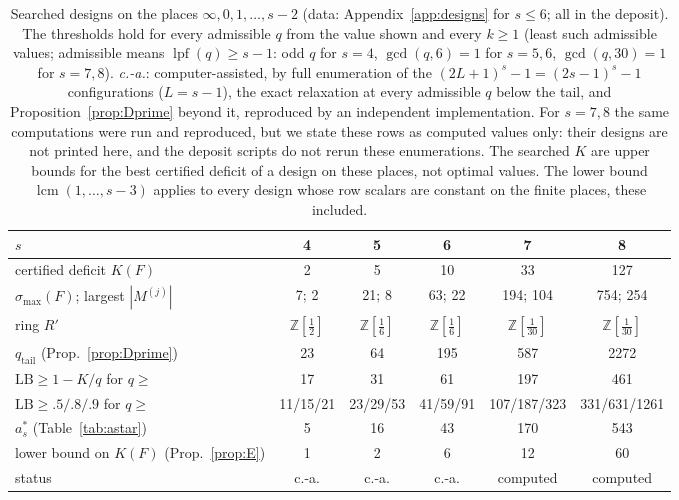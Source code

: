 \documentclass[11pt]{amsart}
\theoremstyle{definition}
\theoremstyle{plain}
\newcommand{\Z}{\mathbb{Z}}
\begin{document}
\begin{table}[tbp]
\centering\small\setlength{\tabcolsep}{4.5pt}
\begin{tabular}{@{}lccccc@{}}
\toprule
$s$ & 4 & 5 & 6 & 7 & 8\\
\midrule
certified deficit $K(F)$ & 2 & 5 & 10 & 33 & 127\\
$\sigma_{\max}(F)$; largest $|M^{(j)}|$ & 7; 2 & 21; 8 & 63; 22 & 194; 104 & 754; 254\\
ring $R'$ & $\Z[\frac12]$ & $\Z[\frac16]$ & $\Z[\frac16]$ & $\Z[\frac1{30}]$ & $\Z[\frac1{30}]$\\
$q_{\mathrm{tail}}$ (Prop.~\ref{prop:Dprime}) & 23 & 64 & 195 & 587 & 2272\\
$\mathrm{LB}\ge1-K/q$ for $q\ge$ & 17 & 31 & 61 & 197 & 461\\
$\mathrm{LB}\ge.5/.8/.9$ for $q\ge$ & 11/15/21 & 23/29/53 & 41/59/91 & 107/187/323 & 331/631/1261\\
\midrule
$a^*_s$ (Table~\ref{tab:astar}) & 5 & 16 & 43 & 170 & 543\\
lower bound on $K(F)$ (Prop.~\ref{prop:E}) & 1 & 2 & 6 & 12 & 60\\
status & c.-a. & c.-a. & c.-a. & computed & computed\\
\bottomrule
\end{tabular}
\medskip
\caption{Searched designs on the places $\infty,0,1,\dots,s-2$ (data: Appendix~\ref{app:designs} for $s\le6$; all in the deposit). The thresholds hold for every admissible $q$ from the value shown and every $k\ge1$ (least such admissible values; admissible means $\operatorname{lpf}(q)\ge s-1$: odd $q$ for $s=4$, $\gcd(q,6)=1$ for $s=5,6$, $\gcd(q,30)=1$ for $s=7,8$). \emph{c.-a.}: computer-assisted, by full enumeration of the $(2L+1)^s-1=(2s-1)^s-1$ configurations ($L=s-1$), the exact relaxation at every admissible $q$ below the tail, and Proposition~\ref{prop:Dprime} beyond it, reproduced by an independent implementation. For $s=7,8$ the same computations were run and reproduced, but we state these rows as computed values only: their designs are not printed here, and the deposit scripts do not rerun these enumerations. The searched $K$ are upper bounds for the best certified deficit of a design on these places, not optimal values. The lower bound $\operatorname{lcm}(1,\dots,s-3)$ applies to every design whose row scalars are constant on the finite places, these included.}
\label{tab:Kdesigns}
\end{table}
\end{document}
